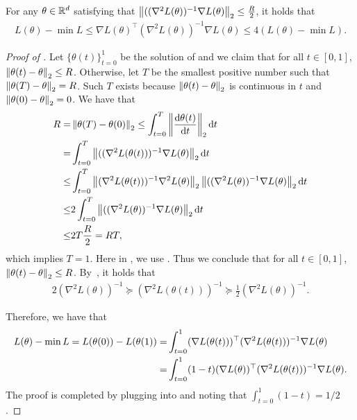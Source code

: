 \begin{lemma}\label{lem:no_clipping_imply_loss_approximation}
	For any $\theta\in\mathbb{R}^d$ satisfying that $\left\|((\nabla^2 L(\theta))^{-1}\nabla L(\theta)\right\|_2\le \frac{R}{2}$, it holds that 
	\begin{align}
L(\theta) - \min L	\le \nabla L(\theta)^\top (\nabla^2 L(\theta))^{-1}\nabla L(\theta) \le  4(L(\theta) - \min L).
 \end{align}
\end{lemma}
\begin{proof}[Proof of ]
	Let $\{\theta(t)\}_{t=0}^1$ be the solution of  and we claim that for all $t\in[0,1]$, $\left\|\theta(t) -\theta\right\|_2\le R$. Otherwise, let $T$ be the smallest positive number such that $\left\|\theta(T) -\theta\right\|_2=R$. Such $T$ exists because $\left\|\theta(t) -\theta\right\|_2$ is continuous in $t$ and $\left\|\theta(0) -\theta\right\|_2=0$. We have that 
	\begin{align}
	R=&\left\|\theta(T)-\theta(0)\right\|_2 \le \int_{t=0}^T \left\|\frac{\mathrm{d} \theta(t)}{\mathrm{d} t}\right\|_2\mathrm{d} t \\
	=&\int_{t=0}^T \left\|((\nabla^2 L(\theta(t)))^{-1}\nabla L(\theta)\right\|_2\mathrm{d} t 	\\
	\le &  \int_{t=0}^T \left\|(\nabla^2 L(\theta(t)))^{-1} \nabla^2 L(\theta)\right\|_2\left\|((\nabla^2 L(\theta))^{-1}\nabla L(\theta)\right\|_2\mathrm{d} t 	 \\
	\le & 2 \int_{t=0}^T \left\|((\nabla^2 L(\theta))^{-1}\nabla L(\theta)\right\|_2\mathrm{d} t 	\label{eq:local_1} \\
	\le &2 T\frac{R}{2} =RT,
	\end{align}
which implies $T=1$. Here in , we use . Thus we conclude that for all $t\in[0,1]$, $\left\|\theta(t) -\theta\right\|_2\le R$.  By~, it holds that 
\begin{align}\label{eq:no_clipping_hessian_sanwidch}
	2(\nabla^2 L(\theta))^{-1} \succeq (\nabla^2 L(\theta(t)))^{-1}\succeq \frac{1}{2}(\nabla^2 L(\theta))^{-1}.
\end{align}

 Therefore, we have that 
\begin{align}\label{eq:no_clipping_loss_integral}
L(\theta) - \min L = L(\theta(0))-L(\theta(1)) 
=&\int_{t=0}^1  	(\nabla L(\theta(t)))^\top (\nabla^2 L(\theta(t)))^{-1} \nabla L(\theta)\notag\\
=&\int_{t=0}^1 	(1-t)	(\nabla L(\theta))^\top (\nabla^2 L(\theta(t)))^{-1} \nabla L(\theta).
\end{align}
The proof is completed by plugging  into  and noting that $\int_{t=0}^1(1-t) = 1/2$.
\end{proof}




